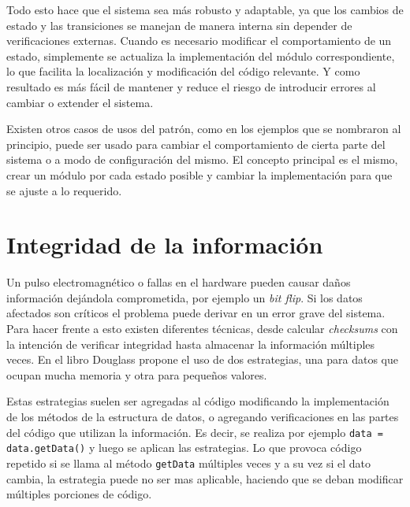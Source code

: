 Todo esto hace que el sistema sea más robusto y adaptable, ya que los cambios de estado y las transiciones se manejan de manera interna sin depender de verificaciones externas. Cuando es necesario modificar el comportamiento de un estado, simplemente se actualiza la implementación del módulo correspondiente, lo que facilita la localización y modificación del código relevante. Y como resultado es más fácil de mantener y reduce el riesgo de introducir errores al cambiar o extender el sistema.

Existen otros casos de usos del patrón, como en los ejemplos que se nombraron al principio, puede ser usado para cambiar el comportamiento de cierta parte del sistema o a modo de configuración del mismo. El concepto principal es el mismo, crear un módulo por cada estado posible y cambiar la implementación para que se ajuste a lo requerido.

\section{Integridad de la información}
Un pulso electromagnético o fallas en el hardware pueden causar daños información dejándola comprometida, por ejemplo un \textit{bit flip}. Si los datos afectados son críticos el problema puede derivar en un error grave del sistema. Para hacer frente a esto existen diferentes técnicas, desde calcular \textit{checksums} con la intención de verificar integridad hasta almacenar la información múltiples veces. En el libro Douglass propone el uso de dos estrategias, una para datos que ocupan mucha memoria y otra para pequeños valores.

Estas estrategias suelen ser agregadas al código modificando la implementación de los métodos de la estructura de datos, o agregando verificaciones en las partes del código que utilizan la información. Es decir, se realiza por ejemplo \verb|data = data.getData()| y luego se aplican las estrategias. Lo que provoca código repetido si se llama al método \verb|getData| múltiples veces y a su vez si el dato cambia, la estrategia puede no ser mas aplicable, haciendo que se deban modificar múltiples porciones de código.

\begin{figure}[h]
\begin{center}
\end{center}
\end{figure}

